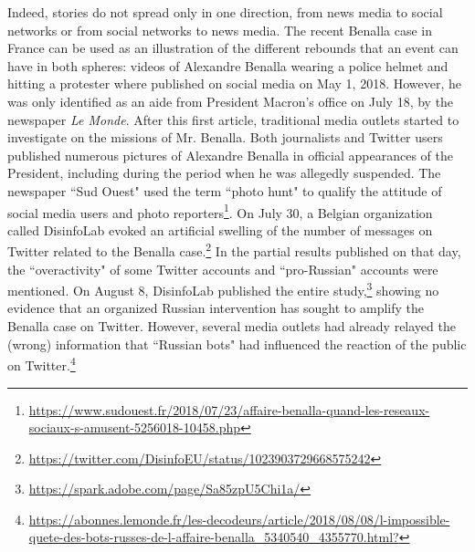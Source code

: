 Indeed, stories do not spread only in one direction, from news media to social networks or from social networks to news media. The recent Benalla case in France can be used as an illustration of the different rebounds that an event can have in both spheres: videos of Alexandre Benalla wearing a police helmet and hitting a protester where published on social media on May 1, 2018. However, he was only identified as an aide from President Macron's office on July 18, by the newspaper \textit{Le Monde}. After this first article, traditional media outlets started to investigate on the missions of Mr. Benalla. Both journalists and Twitter users published numerous pictures of Alexandre Benalla in official appearances of the President, including during the period when he was allegedly suspended. The newspaper ``Sud Ouest" used the term ``photo hunt" to qualify the attitude of social media users and photo reporters\footnote{\url{https://www.sudouest.fr/2018/07/23/affaire-benalla-quand-les-reseaux-sociaux-s-amusent-5256018-10458.php}}. On July 30, a Belgian organization called DisinfoLab evoked an artificial swelling of the number of messages on Twitter related to the Benalla case.\footnote{\url{https://twitter.com/DisinfoEU/status/1023903729668575242}} In the partial results published on that day, the ``overactivity" of some Twitter accounts and ``pro-Russian" accounts were mentioned. On August 8, DisinfoLab published the entire study,\footnote{\url{https://spark.adobe.com/page/Sa85zpU5Chi1a/}} showing no evidence that an organized Russian intervention has sought to amplify the Benalla case on Twitter. However, several media outlets had already relayed the (wrong) information that ``Russian bots"  had influenced the reaction of the public on Twitter.\footnote{\url{https://abonnes.lemonde.fr/les-decodeurs/article/2018/08/08/l-impossible-quete-des-bots-russes-de-l-affaire-benalla_5340540_4355770.html?}}


